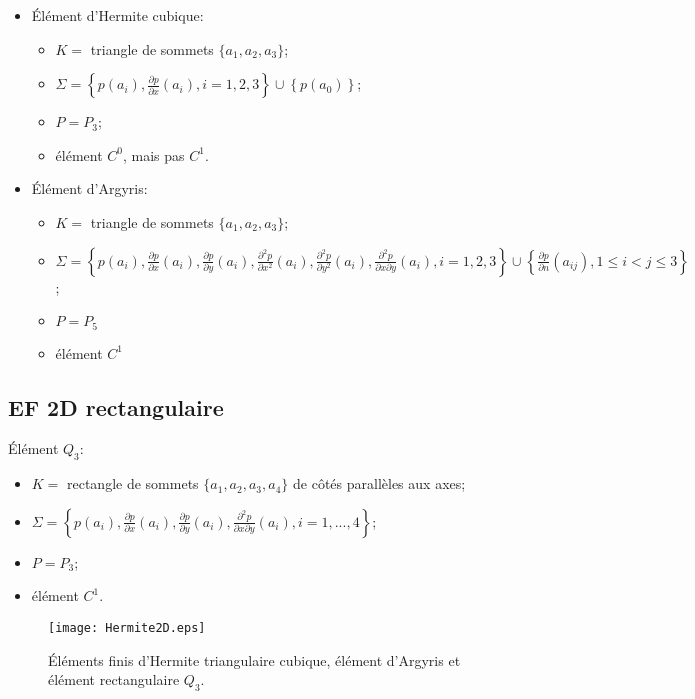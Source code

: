 \begin{itemize}
   \item Élément d'Hermite cubique:
	\begin{itemize}
	   \item $K=$ triangle de sommets $\{a_1, a_2, a_3\}$;
	   \item $\Sigma=\left\{p(a_i), \frac{\partial p}{\partial x}(a_i), i=1, 2, 3\right\}
		\cup\left\{p(a_0)\right\}$;
	   \item $P=P_3$;
	   \item élément $C^0$, mais pas $C^1$.
	\end{itemize}
   \item Élément d'Argyris:
	\begin{itemize}
	   \item $K=$ triangle de sommets $\{a_1, a_2, a_3\}$;
	   \item $\Sigma=\left\{p(a_i), \frac{\partial p}{\partial x}(a_i), \frac{\partial p}{\partial y}(a_i),
		\frac{\partial^2 p}{\partial x^2}(a_i), \frac{\partial^2 p}{\partial y^2}(a_i),
		\frac{\partial^2 p}{\partial x\partial y}(a_i), i=1, 2, 3\right\}
		\cup\left\{\frac{\partial p}{\partial n}(a_{ij}), 1\le i<j\le3\right\}$;
	   \item $P=P_5$
	   \item élément $C^1$
	\end{itemize}
\end{itemize}

\medskip
\subsection*{EF 2D rectangulaire}

Élément $Q_3$:
\begin{itemize}
   \item $K=$ rectangle de sommets $\{a_1, a_2, a_3, a_4\}$ de côtés parallèles aux axes;
   \item $\Sigma=\left\{p(a_i), \frac{\partial p}{\partial x}(a_i), \frac{\partial p}{\partial y}(a_i),
	\frac{\partial^2 p}{\partial x\partial y}(a_i), i=1,..., 4\right\}$;
   \item $P=P_3$;
   \item élément $C^1$.
\end{itemize}
\begin{figure}[ht]
\begin{center}
\texttt{[image: Hermite2D.eps]}
\end{center}
\caption{\label{Hermite2D} Éléments finis d'Hermite triangulaire cubique, élément d'Argyris 
et élément rectangulaire $Q_3$.}
\end{figure}










